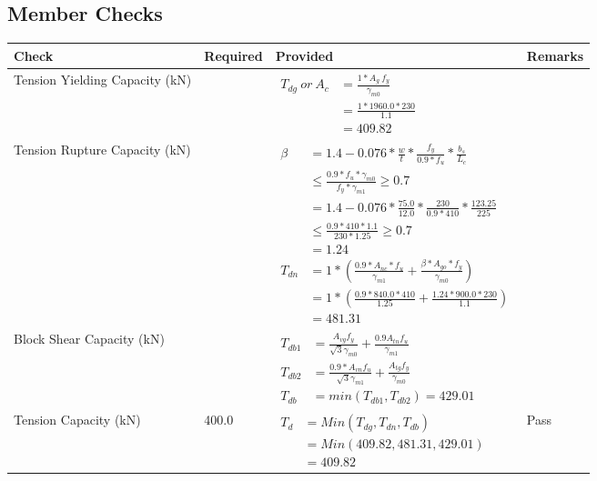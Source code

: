 \documentclass{article}%
\begin{document}
\subsection{Member Checks}%
\label{subsec:MemberChecks}%
\renewcommand{\arraystretch}{1.2}%
\begin{longtable}{|p{2.5cm}|p{5cm}|p{7.5cm}|p{1cm}|}%
\hline%
\rowcolor{OsdagGreen}%
Check&Required&Provided&Remarks\\%
\hline%
\endhead%
\hline%
Tension Yielding Capacity (kN)&&$\begin{aligned}T_{dg}~or~A_c&= \frac{1 * A_g ~ f_y}{\gamma_{m0}}\\ &= \frac{1*1960.0*230}{1.1}\\ &= 409.82\end{aligned}$&\\%
\hline%
Tension Rupture Capacity (kN)&&$\begin{aligned}\beta &= 1.4 - 0.076*\frac{w}{t}*\frac{f_{y}}{0.9*f_{u}}*\frac{b_s}{L_c}\\ &\leq\frac{0.9*f_{u}*\gamma_{m0}}{f_{y}*\gamma_{m1}} \geq 0.7 \\ &= 1.4 - 0.076*\frac{75.0}{12.0}*\frac{230}{0.9*410}*\frac{123.25}{225 }\\ &\leq\frac{0.9* 410*1.1}{230*1.25} \geq 0.7 \\ &= 1.24\\ T_{dn} &= 1*(\frac{0.9*A_{nc}*f_{u}}{\gamma_{m1}} + \frac{\beta * A_{go} * f_{y}}{\gamma_{m0}})\\ &= 1*(\frac{0.9* 840.0*410}{1.25} + \frac{1.24*900.0*230}{1.1})\\ &= 481.31\end{aligned}$&\\%
\hline%
Block Shear Capacity (kN)&&$\begin{aligned}T_{db1} &= \frac{A_{vg} f_{y}}{\sqrt{3} \gamma_{m0}} + \frac{0.9 A_{tn} f_{u}}{\gamma_{m1}}\\ T_{db2} &= \frac{0.9*A_{vn} f_{u}}{\sqrt{3} \gamma_{m1}} + \frac{A_{tg} f_{y}}{\gamma_{m0}}\\ T_{db} &= min(T_{db1}, T_{db2})= 429.01\end{aligned}$&\\%
\hline%
Tension Capacity (kN)&400.0&$\begin{aligned} T_d &= Min(T_{dg},T_{dn},T_{db})\\ &= Min(409.82,481.31,429.01)\\ &=409.82\end{aligned}$&Pass\\%

\end{longtable}
\end{document}
